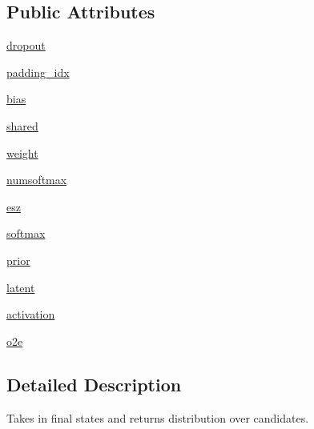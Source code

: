 \subsection*{Public Attributes}
\begin{DoxyCompactItemize}
\item 
\hyperlink{classparlai_1_1agents_1_1seq2seq_1_1modules_1_1OutputLayer_aa9bb2d06eae7ebeb2fc1d2d0a27e0c3b}{dropout}
\item 
\hyperlink{classparlai_1_1agents_1_1seq2seq_1_1modules_1_1OutputLayer_acc82ef26b2a162662c729fc325d39b54}{padding\+\_\+idx}
\item 
\hyperlink{classparlai_1_1agents_1_1seq2seq_1_1modules_1_1OutputLayer_af9588423b3853ca292927fc37a24a674}{bias}
\item 
\hyperlink{classparlai_1_1agents_1_1seq2seq_1_1modules_1_1OutputLayer_a83aa3c50706ed16f09ee44423dbb73ad}{shared}
\item 
\hyperlink{classparlai_1_1agents_1_1seq2seq_1_1modules_1_1OutputLayer_a7a1a9304974964821e1d4d73bdccec0a}{weight}
\item 
\hyperlink{classparlai_1_1agents_1_1seq2seq_1_1modules_1_1OutputLayer_a1a08bf54424b676bb5f35aa2ca8dc096}{numsoftmax}
\item 
\hyperlink{classparlai_1_1agents_1_1seq2seq_1_1modules_1_1OutputLayer_a8764480c3d69166a1bc8b80886c16a97}{esz}
\item 
\hyperlink{classparlai_1_1agents_1_1seq2seq_1_1modules_1_1OutputLayer_ab2922db72cff29a3c4853dd25a464a93}{softmax}
\item 
\hyperlink{classparlai_1_1agents_1_1seq2seq_1_1modules_1_1OutputLayer_aa727b98d848c1dcdee4149255d2d30ed}{prior}
\item 
\hyperlink{classparlai_1_1agents_1_1seq2seq_1_1modules_1_1OutputLayer_ace91a61ce9d1afaf8e69c8891dc37de4}{latent}
\item 
\hyperlink{classparlai_1_1agents_1_1seq2seq_1_1modules_1_1OutputLayer_a0654abd36d1e9fc9425ac366ded9d624}{activation}
\item 
\hyperlink{classparlai_1_1agents_1_1seq2seq_1_1modules_1_1OutputLayer_a0d76edf5fb553c45e025103b154b34a1}{o2e}
\end{DoxyCompactItemize}


\subsection{Detailed Description}
\begin{DoxyVerb}Takes in final states and returns distribution over candidates.
\end{DoxyVerb}
 

